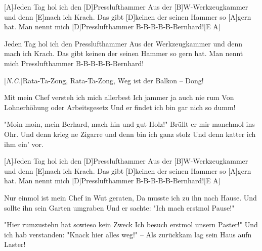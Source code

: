 \begin{guitar}
	
	[A]Jeden Tag hol ich den [D]Presslufthammer
	Aus der [B]W-Werkzeugkammer und denn [E]mach ich Krach.
	Das gibt [D]keinen der seinen Hammer so [A]gern hat.
	Man nennt mich [D]Presslufthammer B-B-B-B-B-Bernhard![E A]{}
	
	Jeden Tag hol ich den Presslufthammer
	Aus der Werkzeugkammer und denn mach ich Krach.
	Das gibt keinen der seinen Hammer so gern hat.
	Man nennt mich Presslufthammer B-B-B-B-B-Bernhard!
	
	[\textit{N.C.}]Rata-Ta-Zong, Rata-Ta-Zong, Weg ist der Balkon – Dong!
	
	Mit mein Chef versteh ich mich allerbest
	Ich jammer ja auch nie rum
	Von Lohnerhöhung oder Arbeitsgesetz
	Und er findet ich bin gar nich so dumm!
	
	"Moin moin, mein Berhard, mach hin und gut Holz!"
	Brüllt er mir manchmol ins Ohr.
	Und denn krieg ne Zigarre und denn bin ich ganz stolz
	Und denn katter ich ihm ein' vor.
	
	[A]Jeden Tag hol ich den [D]Presslufthammer
	Aus der [B]W-Werkzeugkammer und denn [E]mach ich Krach.
	Das gibt [D]keinen der seinen Hammer so [A]gern hat.
	Man nennt mich [D]Presslufthammer B-B-B-B-B-Bernhard![E A]{}
	
	Nur einmol ist mein Chef in Wut geraten,
	Da musste ich zu ihn nach Hause.
	Und sollte ihn sein Garten umgraben
	Und er sachte: "Ich mach erstmol Pause!"
	
	"Hier rumzustehn hat sowieso kein Zweck
	Ich besuch erstmol unsern Paster!"
	Und ich hab verstanden: "Knack hier alles weg!" –
	Als zurückkam lag sein Haus aufn Laster!
	
	 
\end{guitar}
